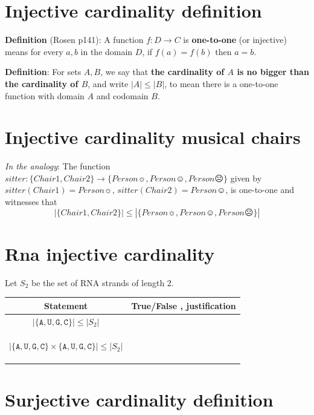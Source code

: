 \documentclass[12pt, oneside]{article}
\newcommand{\A}[0]{\texttt{A}}
\newcommand{\C}[0]{\texttt{C}}
\newcommand{\G}[0]{\texttt{G}}
\newcommand{\U}[0]{\texttt{U}}
\begin{document}
\section*{Injective cardinality definition}


{\bf Definition}  (Rosen p141): A function $f: D  \to C$ is {\bf one-to-one} (or  injective) means for every $a,b$ in the domain $D$, 
if $f(a) = f(b)$ then  $a=b$.

{\bf Definition}:  For sets $A, B$, we say that  {\bf the  cardinality of $A$ is  no  bigger than the cardinality of  $B$}, and 
write $|A| \leq |B|$, to mean there is a  one-to-one function  with domain $A$  and codomain $B$. \vfill
\section*{Injective cardinality musical chairs}


{\it In the analogy}: The function $sitter: \{ Chair1, Chair2\} \to \{ Person\sun, Person\smiley, Person\frownie \}$ given
by $sitter(Chair1) = Person\sun$,  $sitter(Chair2) = Person\smiley$, is one-to-one and witnesses that 
\[
| \{ Chair1, Chair2\} | \leq |\{ Person\sun, Person\smiley, Person\frownie \}|
\] \vfill
\section*{Rna injective cardinality}


Let $S_2$ be the set of RNA strands of length 2.

\vspace{-20pt}

\begin{center}
\begin{tabular}{|c|p{5in}|}
\hline
Statement  &  True/False , justification \\
\hline
$| \{\A,\U,\G,\C\} | \leq |S_2 |$ &  \\
&\\&\\&\\
\hline
$| \{\A,\U,\G,\C\} \times \{\A, \U, \G,\C\} | \leq |S_2 |$ &  \\
&\\&\\&\\
\hline
\end{tabular}
\end{center} \vfill
\section*{Surjective cardinality definition}
\end{document}
